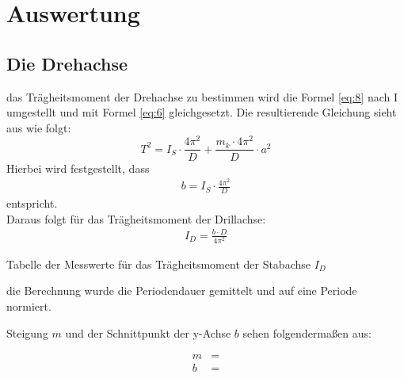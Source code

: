 \section{Auswertung}\justifying

\subsection{Die Drehachse}\justifying %

\justifying das Trägheitsmoment der Drehachse zu bestimmen wird die Formel \eqref{eq:8} nach I umgestellt und mit Formel %
\eqref{eq:6} gleichgesetzt. Die resultierende Gleichung sieht aus wie folgt:
\begin{equation}
T^2 = I_S \cdot \frac{4\pi^2}{D} + \frac{m_k \cdot 4\pi^2}{D} \cdot a^2\label{eq:11}
\end{equation} 
Hierbei wird festgestellt, dass
\begin{align}
    b=I_S \cdot \frac{4\pi^2}{D} \label{eq:12}
\end{align}
entspricht.\\
Daraus folgt für das Trägheitsmoment der Drillachse:
\begin{align}
    I_D = \frac{b \cdot D}{4 \pi^2} \label{eq:13}
\end{align}
\begin{table}[H]
    \centering
    
    \caption{Tabelle der Messwerte für das Trägheitsmoment der Stabachse $I_D$}
    \label{tab:IStab}
\end{table}

 die Berechnung wurde die Periodendauer gemittelt und auf eine Periode normiert.

\justifying Steigung $m$ und der Schnittpunkt der y-Achse $b$ sehen folgendermaßen aus:

\begin{subequations}
\begin{align}
m &= \text{}\label{eq:14a}\\
b &= \text{}\label{eq:14b}
\end{align}
\end{subequations}

